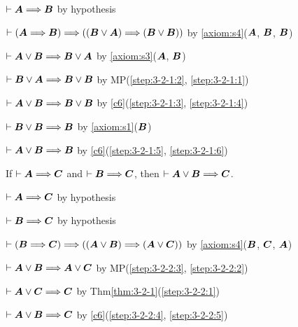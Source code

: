 \begin{pf}
\item\label{step:3-2-1:1}\Pf $\vdash\boldsymbol{A}\Longrightarrow\boldsymbol{B}$
  by hypothesis
\item\label{step:3-2-1:2} $\vdash(\boldsymbol{A}\Longrightarrow\boldsymbol{B})\Longrightarrow((\boldsymbol{B}\lor\boldsymbol{A})\Longrightarrow(\boldsymbol{B}\lor\boldsymbol{B}))$
by \ref{axiom:s4}($\boldsymbol{A}$, $\boldsymbol{B}$, $\boldsymbol{B}$)
\item\label{step:3-2-1:3} $\vdash\boldsymbol{A}\lor\boldsymbol{B}\Longrightarrow\boldsymbol{B}\lor\boldsymbol{A}$
by \ref{axiom:s3}($\boldsymbol{A}$, $\boldsymbol{B}$)
\item\label{step:3-2-1:4} $\vdash\boldsymbol{B}\lor\boldsymbol{A}\Longrightarrow\boldsymbol{B}\lor\boldsymbol{B}$
by MP(\ref{step:3-2-1:2}, \ref{step:3-2-1:1})
\item\label{step:3-2-1:5} $\vdash\boldsymbol{A}\lor\boldsymbol{B}\Longrightarrow\boldsymbol{B}\lor\boldsymbol{B}$
by \ref{c6}(\ref{step:3-2-1:3}, \ref{step:3-2-1:4})
\item\label{step:3-2-1:6} $\vdash\boldsymbol{B}\lor\boldsymbol{B}\Longrightarrow\boldsymbol{B}$
  by \ref{axiom:s1}($\boldsymbol{B}$)
\item\label{step:3-2-1:7} $\vdash\boldsymbol{A}\lor\boldsymbol{B}\Longrightarrow\boldsymbol{B}$
  by \ref{c6}(\ref{step:3-2-1:5}, \ref{step:3-2-1:6})
\end{pf}

\begin{theorem}\label{thm:3-2-2}%
If $\vdash\boldsymbol{A}\Longrightarrow\boldsymbol{C}$
and $\vdash\boldsymbol{B}\Longrightarrow\boldsymbol{C}$,
then $\vdash\boldsymbol{A}\lor\boldsymbol{B}\Longrightarrow\boldsymbol{C}$.
\end{theorem}

\begin{pf}
\item\label{step:3-2-2:1}\Pf $\vdash\boldsymbol{A}\Longrightarrow\boldsymbol{C}$
  by hypothesis
\item\label{step:3-2-2:2} $\vdash\boldsymbol{B}\Longrightarrow\boldsymbol{C}$
  by hypothesis
\item\label{step:3-2-2:3} $\vdash(\boldsymbol{B}\Longrightarrow\boldsymbol{C})\Longrightarrow((\boldsymbol{A}\lor\boldsymbol{B})\Longrightarrow(\boldsymbol{A}\lor\boldsymbol{C}))$
  by \ref{axiom:s4}($\boldsymbol{B}$, $\boldsymbol{C}$, $\boldsymbol{A}$)
\item\label{step:3-2-2:4} $\vdash\boldsymbol{A}\lor\boldsymbol{B}\Longrightarrow\boldsymbol{A}\lor\boldsymbol{C}$
  by MP(\ref{step:3-2-2:3}, \ref{step:3-2-2:2})
\item\label{step:3-2-2:5} $\vdash\boldsymbol{A}\lor\boldsymbol{C}\Longrightarrow\boldsymbol{C}$
  by Thm\ref{thm:3-2-1}(\ref{step:3-2-2:1})
\item\label{step:3-2-2:6} $\vdash\boldsymbol{A}\lor\boldsymbol{B}\Longrightarrow\boldsymbol{C}$
  by \ref{c6}(\ref{step:3-2-2:4}, \ref{step:3-2-2:5})
\end{pf}
